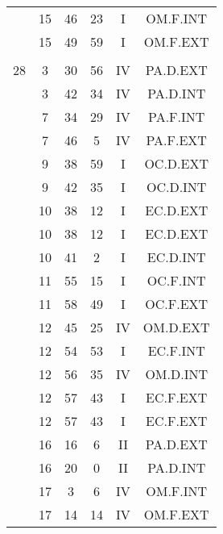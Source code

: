 \documentclass[12pt, a4paper]{article}
\begin{document}
\begin{multicols}{3}
{\begin{tabular}{c c c c c c}
	 	 	 	 & 15 & 46 & 23 & I & OM.F.INT\\%
	 	 	 	 & 15 & 49 & 59 & I & OM.F.EXT\\%
	 	 	 	 & & & & & \\%
	 	 	 	28 & 3 & 30 & 56 & IV & PA.D.EXT\\%
	 	 	 	 & 3 & 42 & 34 & IV & PA.D.INT\\%
	 	 	 	 & 7 & 34 & 29 & IV & PA.F.INT\\%
	 	 	 	 & 7 & 46 & 5 & IV & PA.F.EXT\\%
	 	 	 	 & 9 & 38 & 59 & I & OC.D.EXT\\%
	 	 	 	 & 9 & 42 & 35 & I & OC.D.INT\\%
	 	 	 	 & 10 & 38 & 12 & I & EC.D.EXT\\%
	 	 	 	 & 10 & 38 & 12 & I & EC.D.EXT\\%
	 	 	 	 & 10 & 41 & 2 & I & EC.D.INT\\%
	 	 	 	 & 11 & 55 & 15 & I & OC.F.INT\\%
	 	 	 	 & 11 & 58 & 49 & I & OC.F.EXT\\%
	 	 	 	 & 12 & 45 & 25 & IV & OM.D.EXT\\%
	 	 	 	 & 12 & 54 & 53 & I & EC.F.INT\\%
	 	 	 	 & 12 & 56 & 35 & IV & OM.D.INT\\%
	 	 	 	 & 12 & 57 & 43 & I & EC.F.EXT\\%
	 	 	 	 & 12 & 57 & 43 & I & EC.F.EXT\\%
	 	 	 	 & 16 & 16 & 6 & II & PA.D.EXT\\%
	 	 	 	 & 16 & 20 & 0 & II & PA.D.INT\\%
	 	 	 	 & 17 & 3 & 6 & IV & OM.F.INT\\%
	 	 	 	 & 17 & 14 & 14 & IV & OM.F.EXT\\%

\end{tabular}}
\end{multicols}
\end{document}
